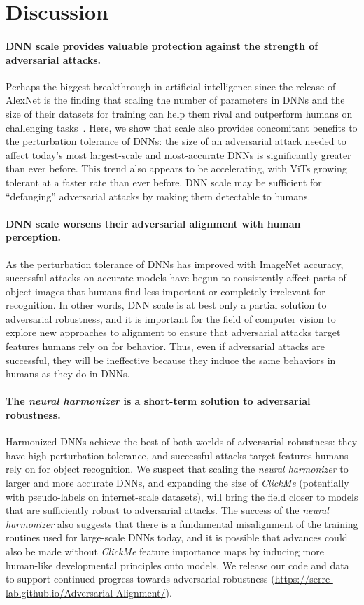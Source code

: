 \documentclass{article}
\theoremstyle{plain}
\theoremstyle{definition}
\theoremstyle{remark}
\begin{document}
\section{Discussion}
\paragraph{DNN scale provides valuable protection against the strength of adversarial attacks.} Perhaps the biggest breakthrough in artificial intelligence since the release of AlexNet is the finding that scaling the number of parameters in DNNs and the size of their datasets for training can help them rival and outperform humans on challenging tasks~\cite{Kaplan2020-zx,Dehghani2023-zw}. Here, we show that scale also provides concomitant benefits to the perturbation tolerance of DNNs: the size of an adversarial attack needed to affect today's most largest-scale and most-accurate DNNs is significantly greater than ever before. This trend also appears to be accelerating, with ViTs growing tolerant at a faster rate than ever before. DNN scale may be sufficient for ``defanging'' adversarial attacks by making them detectable to humans.

\paragraph{DNN scale worsens their adversarial alignment with human perception.} As the perturbation tolerance of DNNs has improved with ImageNet accuracy, successful attacks on accurate models have begun to consistently affect parts of object images that humans find less important or completely irrelevant for recognition. In other words, DNN scale is at best only a partial solution to adversarial robustness, and it is important for the field of computer vision to explore new approaches to alignment to ensure that adversarial attacks target features humans rely on for behavior. Thus, even if adversarial attacks are successful, they will be ineffective because they induce the same behaviors in humans as they do in DNNs.

\paragraph{The \emph{neural harmonizer} is a short-term solution to adversarial robustness.} Harmonized DNNs achieve the best of both worlds of adversarial robustness: they have high perturbation tolerance, and successful attacks target features humans rely on for object recognition. We suspect that scaling the \emph{neural harmonizer} to larger and more accurate DNNs, and expanding the size of \emph{ClickMe} (potentially with pseudo-labels on internet-scale datasets), will bring the field closer to models that are sufficiently robust to adversarial attacks. The success of the \emph{neural harmonizer} also suggests that there is a fundamental misalignment of the training routines used for large-scale DNNs today, and it is possible that advances could also be made without \emph{ClickMe} feature importance maps by inducing more human-like developmental principles onto models. We release our code and data to support continued progress towards adversarial robustness (\url{https://serre-lab.github.io/Adversarial-Alignment/}).
\end{document}
